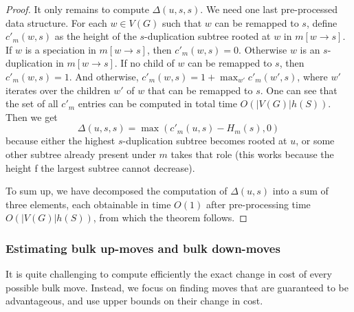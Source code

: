 \documentclass[10pt]{article}
\begin{document}
\begin{proof}
It only remains to compute $\Delta(u, s, s)$.  We need one last pre-processed data structure.  
For each $w \in V(G)$ such that $w$ can be remapped to $s$, define $c'_m(w, s)$ as the height of the $s$-duplication subtree 
rooted at $w$ in $m[w \rightarrow s]$.  If $w$ is a speciation in $m[w \rightarrow s]$, then $c'_m(w, s) = 0$.  
Otherwise $w$ is an $s$-duplication in $m[w \rightarrow s]$.  If no child of $w$ can be remapped to $s$, then $c'_m(w, s) = 1$.
And otherwise, $c'_m(w, s) = 1 + \max_{w'} c'_m(w', s)$, where $w'$ iterates over the children $w'$ of $w$ that can be remapped to $s$. 
One can see that the set of all $c'_m$ entries can be computed in total time $O(|V(G)| h(S))$.  
Then we get 
\[
\Delta(u, s, s) = \max(c'_m(u, s) - H_m(s), 0)
\]
because either the highest $s$-duplication subtree becomes rooted at $u$, or some other subtree already present under $m$ takes that role (this works because the height f the largest subtree cannot decrease).

To sum up, we have decomposed the computation of $\Delta(u, s)$ into a sum of three elements, each obtainable in time $O(1)$ 
after pre-processing time $O(|V(G)|h(S))$, from which the theorem follows.
\end{proof}




















\subsubsection{Estimating bulk up-moves and bulk down-moves}

It is quite challenging to compute efficiently the exact change in cost of every possible bulk move.  Instead, we focus on finding moves that are guaranteed to be advantageous, and use upper bounds on their change in cost.
\end{document}
